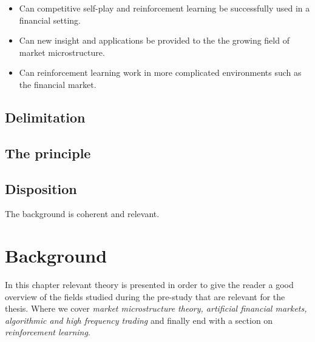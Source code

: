 \documentclass{kththesis}
\theoremstyle{definition}
\begin{document}
\begin{itemize}
    \item Can competitive self-play and reinforcement learning be successfully used in a financial setting. 
    \item Can new insight and applications be provided to the the growing field of market microstructure. 
    \item Can reinforcement learning work in more complicated environments such as the financial market.
\end{itemize}


\section{Delimitation}

\section{The principle}

\section{Disposition}


The background is coherent and relevant.
\chapter{Background}
In this chapter relevant theory is presented in order to give the reader a good overview of the fields studied during the pre-study that are relevant for the thesis. Where we cover \textit{market microstructure theory, artificial financial markets, algorithmic and high frequency trading} and finally end with a section on \textit{reinforcement learning}.





\end{document}
